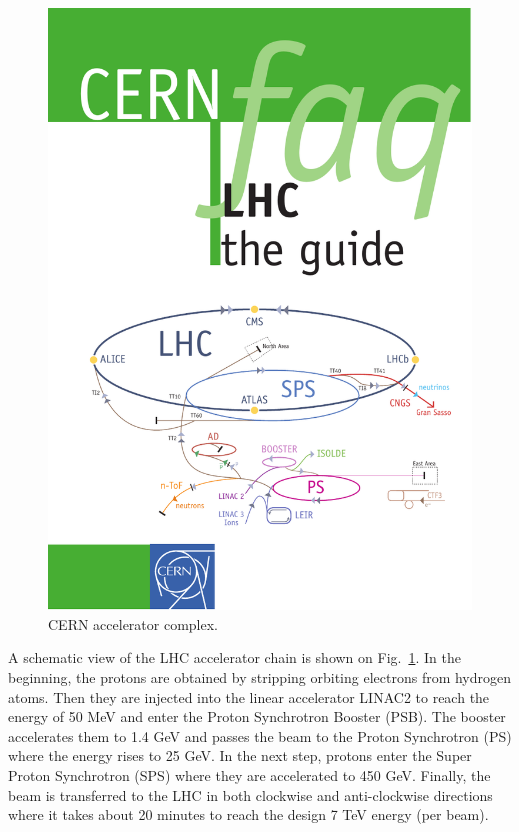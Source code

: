 \begin{figure}[!htbp]
  \begin{center}
    \leavevmode
    \includegraphics[width=\columnwidth]{LHC}
    \caption{CERN accelerator complex.}
    \label{LHC}
  \end{center}
\end{figure}

A schematic view of the LHC accelerator chain is shown on Fig.~\ref{LHC}. In the beginning, the protons are obtained by
stripping orbiting electrons from hydrogen atoms. Then they are injected into the linear accelerator LINAC2 to reach the
energy of 50 MeV and enter the Proton Synchrotron Booster (PSB). The booster accelerates them to 1.4 GeV and passes the
beam to the Proton Synchrotron (PS) where the energy rises to 25 GeV. In the next step, protons enter the Super Proton
Synchrotron (SPS) where they are accelerated to 450 GeV. Finally, the beam is transferred to the LHC in both clockwise
and anti-clockwise directions where it takes about 20 minutes to reach the design 7 TeV energy (per beam).

